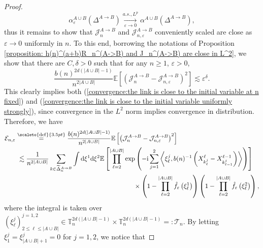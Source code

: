 \documentclass[12pt]{article}
\newcommand{\J}{\mathcal J}
\newcommand{\EE}{\mathbb E}
\newcommand{\TT}{\mathbb T}
\newcommand{\1}{\mathds{1}}
\renewcommand{\d}{\mathrm d}
\renewcommand{\i}{\mathrm i}
\newcommand{\eqdef}{\stackrel{\scaleto{\mathrm{def}}{3.5pt}}{=}}
\numberwithin{equation}{section}
\begin{document}
\begin{proof}
    \begin{equation}
    \label{convergence:a.s. and Lp convergence of smoothed ILT}
        \alpha_\varepsilon^{A\cup B}(\Delta^{A\rightarrow B})\underset{\varepsilon\rightarrow0}{\overset{a.s.,L^p}{\longrightarrow}}\alpha^{A\cup B}(\Delta^{A\rightarrow B}),
    \end{equation}
    thus it remains to show that $\mathcal J_n^{A\rightarrow B}$ and $\mathcal J_{n,\varepsilon}^{A\rightarrow B}$ conveniently scaled are close as $\varepsilon\rightarrow 0$ uniformly in $n$. To this end, borrowing the notations of Proposition \ref{proposition: h(n)^(a+b)R_n^(A->B) and J_n^(A->B) are close in L^2}, we show that there are $C,\delta>0$ such that for any $n\ge1$, $\varepsilon>0$, 
    \begin{equation}
    \label{ineq:J_n(A->B) and J_(n,varepsilon)(A->B) are close}
        \frac{b(n)^{2d\left(|A\cup B|-1\right)}}{n^{2|A\cup B|}}\EE\left[\left(\J_n^{A\rightarrow B}-\J_{n,\varepsilon}^{A\rightarrow B}\right)^2\right]\lesssim\varepsilon^\delta.
    \end{equation}
    This clearly implies both (\ref{convergence:the link is close to the initial variable at n fixed}) and (\ref{convergence:the link is close to the initial variable uniformly strongly}), since convergence in the $L^2$ norm implies convergence in distribution. Therefore, we have
    \begin{align}
    \label{eq:L^2 norm of the difference J_n^(A->B)-J_(n,eps)^(A->B)}
        &\mathcal E_{n,\varepsilon}\eqdef\frac{b(n)^{2d\left(|A\cup B|-1\right)}}{n^{2|A\cup B|}}\EE\left[\left(\J_n^{A\rightarrow B}-\J_{n,\varepsilon}^{A\rightarrow B}\right)^2\right]\nonumber\\
        &\hspace{2em}\lesssim\frac{1}{n^{2|A\cup B|}}\sum_{k\in\widetilde\Delta_n^{A\rightarrow B}}\int\d\xi^1\d\xi^2\EE\left[\prod_{\ell=2}^{|A\cup B|}\exp\left(-\i\sum_{j=1}^2\left\langle\xi_\ell^j,b(n)^{-1}\left(X_{k_\ell^j}^\ell-X_{k_{\ell-1}^j}^{\ell-1}\right)\right\rangle\right)\right]\nonumber\\
        &\hspace{20em}\times\left(1-\prod_{\ell=2}^{|A\cup B|}\hat f_\varepsilon\left(\xi_\ell^1\right)\right)\left(1-\prod_{\ell=2}^{|A\cup B|}\hat f_\varepsilon\left(\xi_\ell^2\right)\right),
    \end{align}
    where the integral is taken over $(\xi_\ell^j)_{2\le\ell\le|A\cup B|}^{j=1,2}\in\TT_n^{2d(|A\cup B|-1)}\times\TT_n^{2d(|A\cup B|-1)}=:\mathcal T_n$. By letting $\xi_1^j=\xi_{|A\cup B|+1}^j=0$ for $j=1,2$, we notice that

\end{proof}
\end{document}
